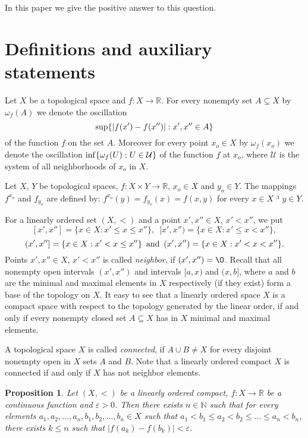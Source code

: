 \documentclass{amsart}
\newtheorem{proposition}[theorem]{Proposition}
\begin{document}
In this paper we give the positive answer to this question.

\section{Definitions and auxiliary statements}

Let $X$ be a topological space and $f:X\to \mathbb R$. For every nonempty set $A\subseteq X$ by $\omega_f(A)$ we denote the oscillation
$${\rm sup}\{|f(x')-f(x'')|:x',x''\in A\}$$
of the function $f$ on the set $A$. Moreover for every point $x_o\in X$ by $\omega_f(x_o)$ we denote the oscillation ${\rm inf}\{\omega_f(U):U\in {\mathcal U}\}$ of the function $f$ at $x_o$, where $\mathcal U$ is the system of all neighborhoods of $x_o$ in $X$.

Let $X$, $Y$ be topological spaces, $f:X\times Y\to \mathbb R$, $x_o\in X$ and $y_o\in Y$. The mappings $f^{x_o}$ and $f_{y_o}$ are defined by: $f^{x_o}(y)=f_{y_o}(x)=f(x,y)$ for every $x\in X$ ³ $y\in Y$.

For a linearly ordered set $(X,<)$ and a point $x', x'' \in X$, $x'<x''$, we put 
$$[x',x'']=\{x\in X: x'\leq x\leq x''\},\,\,\,[x',x'')=\{x\in X: x'\leq x< x''\},$$
$$(x',x'']=\{x\in X: x'< x\leq x''\}\,\,\,{\rm and}\,\,\,(x',x'')=\{x\in X: x'< x < x''\}.$$ Points $x', x''\in X$, $x'<x''$ is called {\it neighbor}, if $(x',x'')=\O$. Recall that all nonempty open intervals $(x',x'')$ and intervals $[a,x)$ and $(x,b]$, where $a$ and $b$ are the minimal and maximal elements in $X$ respectively (if they exist) form a base of the topology on $X$. It easy to see that a linearly ordered space $X$ is a compact space with respect to the topology generated by the linear order, if and only if every nonempty closed set $A\subseteq X$ has in $X$ minimal and maximal elements.

A topological space $X$ is called {\it connected}, if $A\cup B\ne X$ for every disjoint nonempty open in $X$ sets $A$ and $B$. Note that a linearly ordered compact $X$ is connected if and only if $X$ has not neighbor elements.

\begin{proposition} \label{p:2.1} Let $(X,<)$ be a linearly ordered compact, $f:X\to\mathbb R$ be a continuous function and $\varepsilon>0$. Then there exists
$n\in\mathbb N$ such that for every elements $a_1, a_2, \dots , a_n, b_1, b_2, \dots , b_n \in X$ such that $a_1< b_1\leq a_2 < b_2 \leq \dots \leq a_n<b_n$, there exists $k\leq n$ such that $|f(a_k)-f(b_k)|<\varepsilon$.
\end{proposition}
\end{document}
